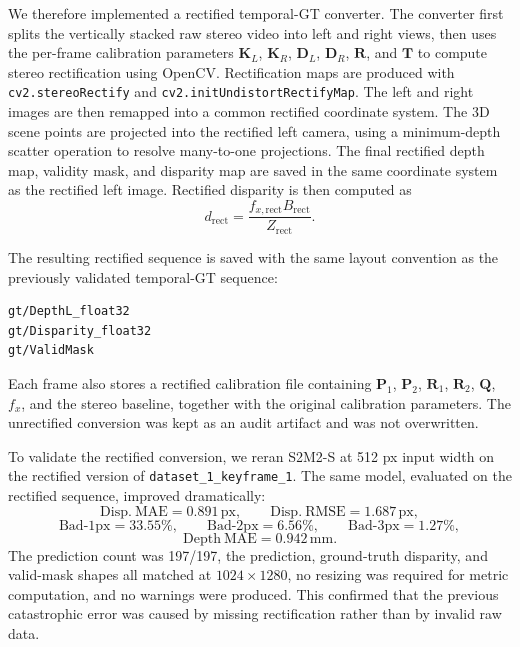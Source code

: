 \documentclass[11pt,a4paper]{article}
\begin{document}
We therefore implemented a rectified temporal-GT converter. The converter first splits the vertically stacked raw stereo video into left and right views, then uses the per-frame calibration parameters \(\mathbf{K}_L\), \(\mathbf{K}_R\), \(\mathbf{D}_L\), \(\mathbf{D}_R\), \(\mathbf{R}\), and \(\mathbf{T}\) to compute stereo rectification using OpenCV. Rectification maps are produced with \texttt{cv2.stereoRectify} and \texttt{cv2.initUndistortRectifyMap}. The left and right images are then remapped into a common rectified coordinate system. The 3D scene points are projected into the rectified left camera, using a minimum-depth scatter operation to resolve many-to-one projections. The final rectified depth map, validity mask, and disparity map are saved in the same coordinate system as the rectified left image. Rectified disparity is then computed as
\begin{equation}
    d_{\mathrm{rect}} =
    \frac{f_{x,\mathrm{rect}} B_{\mathrm{rect}}}{Z_{\mathrm{rect}}}.
\end{equation}

The resulting rectified sequence is saved with the same layout convention as the previously validated temporal-GT sequence:
\begin{verbatim}
gt/DepthL_float32
gt/Disparity_float32
gt/ValidMask
\end{verbatim}
Each frame also stores a rectified calibration file containing \(\mathbf{P}_1\), \(\mathbf{P}_2\), \(\mathbf{R}_1\), \(\mathbf{R}_2\), \(\mathbf{Q}\), \(f_x\), and the stereo baseline, together with the original calibration parameters. The unrectified conversion was kept as an audit artifact and was not overwritten.

To validate the rectified conversion, we reran S2M2-S at 512 px input width on the rectified version of \texttt{dataset\_1\_keyframe\_1}. The same model, evaluated on the rectified sequence, improved dramatically:
\begin{equation}
    \mathrm{Disp.\ MAE} = 0.891\,\mathrm{px},
    \qquad
    \mathrm{Disp.\ RMSE} = 1.687\,\mathrm{px},
\end{equation}
\begin{equation}
    \mathrm{Bad\text{-}1px} = 33.55\%,
    \qquad
    \mathrm{Bad\text{-}2px} = 6.56\%,
    \qquad
    \mathrm{Bad\text{-}3px} = 1.27\%,
\end{equation}
\begin{equation}
    \mathrm{Depth\ MAE} = 0.942\,\mathrm{mm}.
\end{equation}
The prediction count was 197/197, the prediction, ground-truth disparity, and valid-mask shapes all matched at \(1024 \times 1280\), no resizing was required for metric computation, and no warnings were produced. This confirmed that the previous catastrophic error was caused by missing rectification rather than by invalid raw data.
\end{document}
